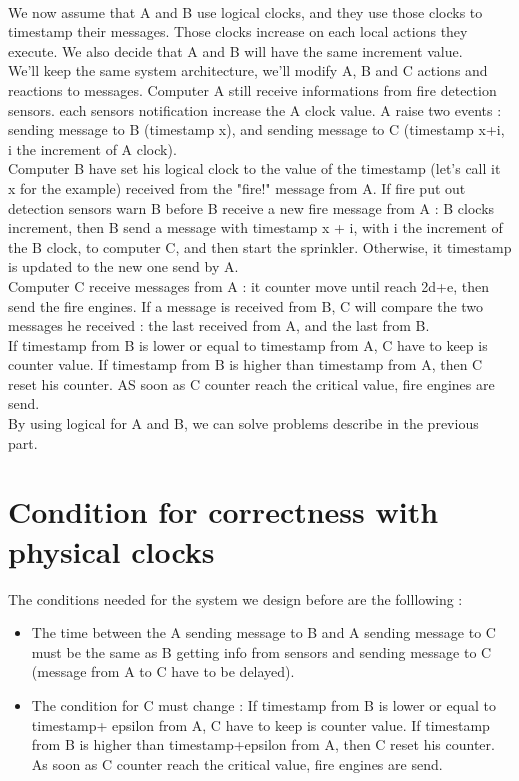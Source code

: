 \documentclass[a4paper,11pt]{article} %
\begin{document}
\paragraph{}We now assume that A and B use logical clocks, and they use those clocks to timestamp their messages. Those clocks increase on each local actions they execute. We also decide that A and B will have the same increment value.\\
We'll keep the same system architecture, we'll modify A, B and C actions and reactions to messages.
Computer A still receive informations from fire detection sensors. each sensors notification increase the A clock value. A raise two events : sending message to B (timestamp x), and sending message to C (timestamp x+i, i the increment of A clock).
\\Computer B have set his logical clock to the value of the timestamp (let's call it x for the example) received from the "fire!" message from A. If fire put out detection sensors warn B before B receive a new fire message from A : B clocks increment, then B send a message with timestamp x + i, with i the increment of the B clock, to computer C, and then start the sprinkler. Otherwise, it timestamp is updated to the new one send by A.
\\Computer C receive messages from A : it counter move until reach 2d+e, then send the fire engines. If a message is received from B, C will compare the two messages he received : the last received from A, and the last from B.
\\If timestamp from B is lower or equal to timestamp from A, C have to keep is counter value. If timestamp from B is higher than timestamp from A, then C reset his counter. AS soon as C counter reach the critical value, fire engines are send.
\\By using logical for A and B, we can solve problems describe in the previous part.

\section{Condition for correctness with physical clocks}
The conditions needed for the system we design before are the folllowing :
\begin{itemize}
\item The time between the A sending message to B and A sending message to C must be the same as B getting info from sensors and sending message to C (message from A to C have to be delayed).
\item The condition for C must change :  If timestamp from B is lower or equal to timestamp+ epsilon from A, C have to keep is counter value. If timestamp from B is higher than timestamp+epsilon from A, then C reset his counter. As soon as C counter reach the critical value, fire engines are send.
\end{itemize}
\end{document}
